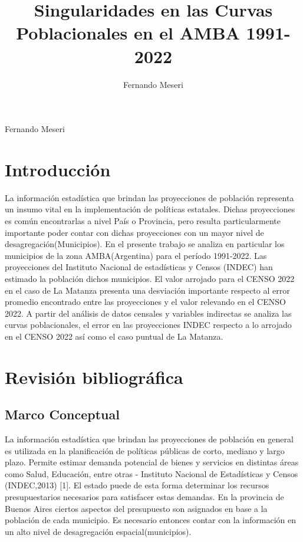 \documentclass{article}
\title{Singularidades en las Curvas Poblacionales en el AMBA 1991-2022}
\author{Fernando Meseri}
\theoremstyle{mytheoremstyle}
\theoremstyle{mytheoremstyle}
\theoremstyle{myproblemstyle}
\begin{document}
    \maketitle
    Fernando Meseri
\section{Introducción}
La información estadística que brindan las proyecciones de población representa un insumo vital en la implementación de 
políticas estatales. Dichas proyecciones es común encontrarlas a nivel País o Provincia, 
pero resulta particularmente importante poder contar con dichas proyecciones con un mayor nivel de desagregación(Municipios).
En el presente trabajo se analiza en particular los municipios de la zona AMBA(Argentina) para el período 1991-2022. 
Las proyecciones del Instituto Nacional de estadísticas y Censos (INDEC) han estimado la población dichos municipios\cite{INDECProyecciones1025}.
 El valor arrojado para el CENSO 2022 en el caso de La Matanza presenta una desviación importante respecto
  al error promedio encontrado entre las proyecciones y el valor relevando en el CENSO 2022. 
  A partir del análisis de datos censales y variables indirectas se analiza las curvas poblacionales,
  el error en las proyecciones INDEC respecto a lo arrojado en el CENSO 2022 así como el caso puntual de La Matanza.
\section{Revisión bibliográfica}
\subsection{Marco Conceptual}
  La información estadística que brindan las proyecciones de población en general es utilizada en  la planificación de políticas públicas de corto, mediano y largo plazo.
   Permite estimar demanda potencial de bienes y servicios en distintas áreas como Salud, Educación, entre otras - Instituto Nacional de Estadísticas y Censos (INDEC,2013) [1]. 
   El estado puede de esta forma determinar los recursos presupuestarios necesarios para satisfacer estas demandas. En la provincia de Buenos Aires ciertos aspectos del presupuesto son asignados en base a la población de cada municipio. Es necesario entonces contar con la información 
  en un alto nivel de desagregación espacial(municipios).
\end{document}

